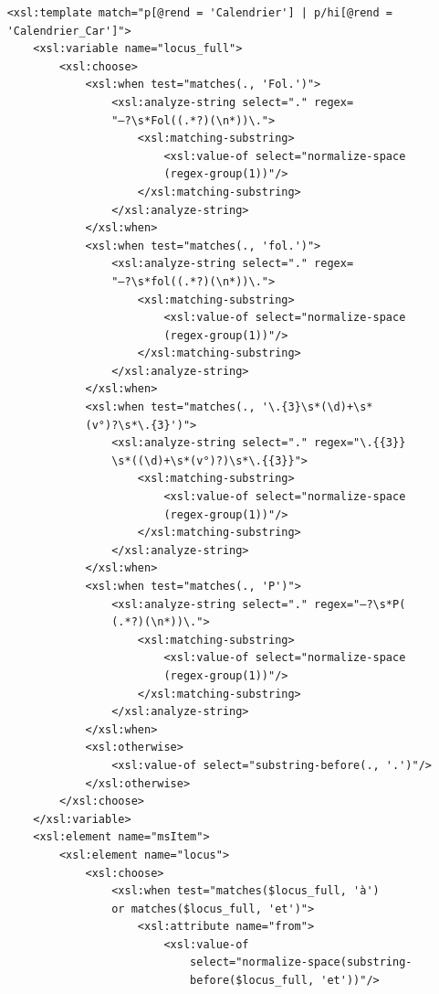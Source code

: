 \documentclass[a4paper,12pt,twoside]{book}
\begin{document}
\begin{verbatim}
    <xsl:template match="p[@rend = 'Calendrier'] | p/hi[@rend = 
    'Calendrier_Car']">
        <xsl:variable name="locus_full">
            <xsl:choose>
                <xsl:when test="matches(., 'Fol.')">
                    <xsl:analyze-string select="." regex=
                    "—?\s*Fol((.*?)(\n*))\.">
                        <xsl:matching-substring>
                            <xsl:value-of select="normalize-space
                            (regex-group(1))"/>
                        </xsl:matching-substring>
                    </xsl:analyze-string>
                </xsl:when>
                <xsl:when test="matches(., 'fol.')">
                    <xsl:analyze-string select="." regex=
                    "—?\s*fol((.*?)(\n*))\.">
                        <xsl:matching-substring>
                            <xsl:value-of select="normalize-space
                            (regex-group(1))"/>
                        </xsl:matching-substring>
                    </xsl:analyze-string>
                </xsl:when>
                <xsl:when test="matches(., '\.{3}\s*(\d)+\s*
                (v°)?\s*\.{3}')">
                    <xsl:analyze-string select="." regex="\.{{3}}
                    \s*((\d)+\s*(v°)?)\s*\.{{3}}">
                        <xsl:matching-substring>
                            <xsl:value-of select="normalize-space
                            (regex-group(1))"/>
                        </xsl:matching-substring>
                    </xsl:analyze-string>
                </xsl:when>
                <xsl:when test="matches(., 'P')">                
                    <xsl:analyze-string select="." regex="—?\s*P(
                    (.*?)(\n*))\.">
                        <xsl:matching-substring>
                            <xsl:value-of select="normalize-space
                            (regex-group(1))"/>
                        </xsl:matching-substring>
                    </xsl:analyze-string>
                </xsl:when>
                <xsl:otherwise>
                    <xsl:value-of select="substring-before(., '.')"/>
                </xsl:otherwise>
            </xsl:choose>
        </xsl:variable>
        <xsl:element name="msItem">
            <xsl:element name="locus">
                <xsl:choose>
                    <xsl:when test="matches($locus_full, 'à') 
                    or matches($locus_full, 'et')">
                        <xsl:attribute name="from">
                            <xsl:value-of
                                select="normalize-space(substring-
                                before($locus_full, 'et'))"/>

\end{verbatim}
\end{document}
